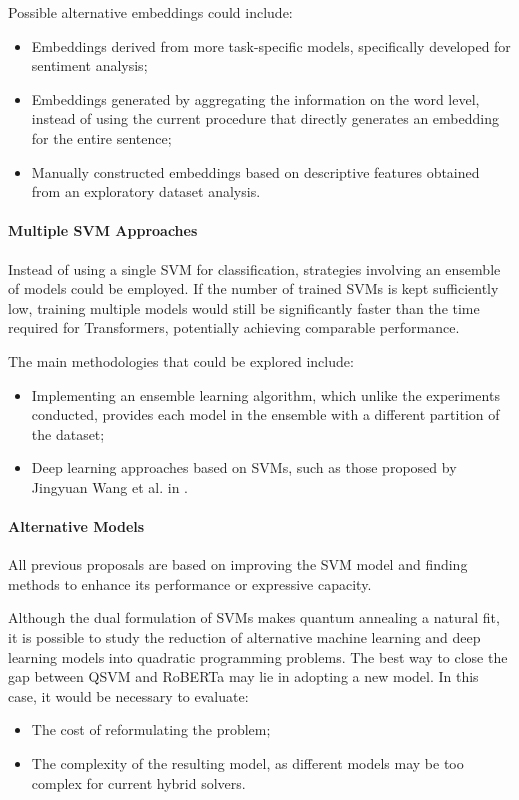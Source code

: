 Possible alternative embeddings could include:
\begin{itemize}
    \item Embeddings derived from more task-specific models, specifically developed for sentiment analysis;
    \item Embeddings generated by aggregating the information on the word level, instead of using the current procedure that directly generates an embedding for the entire sentence;
    \item Manually constructed embeddings based on descriptive features obtained from an exploratory dataset analysis.
\end{itemize}

\paragraph{Multiple SVM Approaches} Instead of using a single SVM for classification, strategies involving an ensemble of models could be employed. If the number of trained SVMs is kept sufficiently low, training multiple models would still be significantly faster than the time required for Transformers, potentially achieving comparable performance.

The main methodologies that could be explored include:
\begin{itemize}
    \item Implementing an ensemble learning algorithm\cite{adaboost}, which unlike the experiments conducted, provides each model in the ensemble with a different partition of the dataset;
    \item Deep learning approaches based on SVMs, such as those proposed by Jingyuan Wang et al. in \cite{deepsvm}.
\end{itemize}

\paragraph{Alternative Models} All previous proposals are based on improving the SVM model and finding methods to enhance its performance or expressive capacity.

Although the dual formulation of SVMs makes quantum annealing a natural fit, it is possible to study the reduction of alternative machine learning and deep learning models into quadratic programming problems. The best way to close the gap between QSVM and RoBERTa may lie in adopting a new model. In this case, it would be necessary to evaluate:
\begin{itemize}
    \item The cost of reformulating the problem;
    \item The complexity of the resulting model, as different models may be too complex for current hybrid solvers.
\end{itemize}

